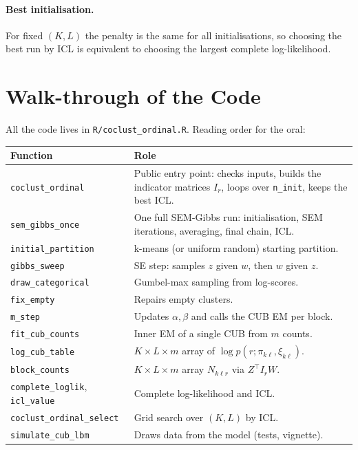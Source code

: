 \paragraph{Best initialisation.} For fixed $(K,L)$ the penalty is the same
for all initialisations, so choosing the best run by ICL is equivalent to
choosing the largest complete log-likelihood.

\section{Walk-through of the Code}

All the code lives in \texttt{R/coclust\_ordinal.R}. Reading order for the
oral:

\begin{center}
\begin{tabular}{lp{9cm}}
\toprule
Function & Role \\
\midrule
\texttt{coclust\_ordinal} & Public entry point: checks inputs, builds the
indicator matrices $I_r$, loops over \texttt{n\_init}, keeps the best ICL. \\
\texttt{sem\_gibbs\_once} & One full SEM-Gibbs run: initialisation, SEM
iterations, averaging, final chain, ICL. \\
\texttt{initial\_partition} & k-means (or uniform random) starting partition. \\
\texttt{gibbs\_sweep} & SE step: samples $z$ given $w$, then $w$ given $z$. \\
\texttt{draw\_categorical} & Gumbel-max sampling from log-scores. \\
\texttt{fix\_empty} & Repairs empty clusters. \\
\texttt{m\_step} & Updates $\alpha,\beta$ and calls the CUB EM per block. \\
\texttt{fit\_cub\_counts} & Inner EM of a single CUB from $m$ counts. \\
\texttt{log\_cub\_table} & $K\times L\times m$ array of $\log p(r;\pi_{k\ell},\xi_{k\ell})$. \\
\texttt{block\_counts} & $K\times L\times m$ array $N_{k\ell r}$ via $Z^\top I_rW$. \\
\texttt{complete\_loglik}, \texttt{icl\_value} & Complete log-likelihood and ICL. \\
\texttt{coclust\_ordinal\_select} & Grid search over $(K,L)$ by ICL. \\
\texttt{simulate\_cub\_lbm} & Draws data from the model (tests, vignette). \\
\bottomrule
\end{tabular}
\end{center}

